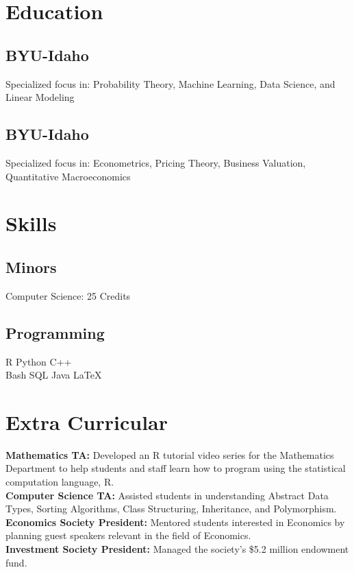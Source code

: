 \documentclass[letterpaper]{deedy-resume}
\begin{document}
\begin{minipage}[t]{0.31\textwidth}
\section{Education} 

\subsection{BYU-Idaho}
\vspace{.02cm}
Specialized focus in:
Probability Theory, Machine Learning,
Data Science, and Linear Modeling
\sectionspace

\subsection{BYU-Idaho}
\vspace{.02cm}
Specialized focus in:
Econometrics, Pricing Theory,
Business Valuation, Quantitative Macroeconomics

\section{Skills}
\subsection{Minors}
\textbullet{} Computer Science: 25 Credits \\

\sectionspace

\subsection{Programming}
\textbullet{} R \textbullet{} Python \textbullet{} C++ \\
\textbullet{} Bash \textbullet{} SQL \textbullet{} Java \textbullet{} \LaTeX{} \\ 

\sectionspace

\section{Extra Curricular}
\textbf{Mathematics TA:} Developed an R tutorial video series for the
Mathematics Department to help students and staff learn
how to program using the statistical computation language, R.\\
\sectionspace
\textbf{Computer Science TA:} Assisted students in understanding
Abstract Data Types, Sorting Algorithms, Class Structuring,
Inheritance, and Polymorphism. \\
\sectionspace
\textbf{Economics Society President:} Mentored students
interested in Economics by planning guest speakers relevant in the
field of Economics.\\
\sectionspace
\textbf{Investment Society President:} Managed the
society's \$5.2 million endowment fund.\\



\end{minipage}
\end{document}
